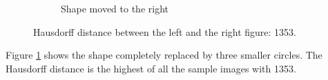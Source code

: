 \begin{figure}[H]
\begin{subfigure}{.35\textwidth}
        \caption{Shape moved to the right}
    \end{subfigure}
    \caption{Hausdorff distance between the left and the right figure: 1353.}
    \label{hdm_smaller_circles}
\end{figure}

Figure \ref{hdm_smaller_circles} shows the shape completely replaced by three smaller circles. The Hausdorff distance is the highest of all the sample images with 1353.
